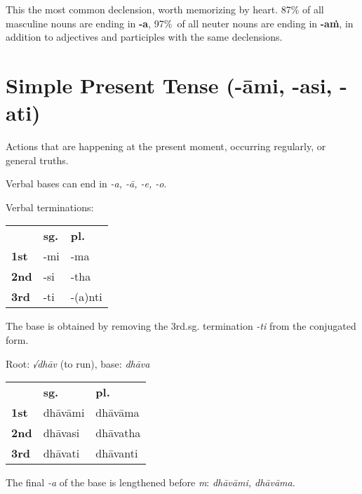 \documentclass[11pt,oneside]{memoir}
\begin{document}
This the most common declension, worth memorizing by heart. 87\% of all masculine
nouns are ending in \textbf{-a}, \mbox{97\% of} all neuter nouns are ending in \textbf{-aṁ}, in
addition to adjectives and participles with the same declensions.

\section{Simple Present Tense (-āmi, -asi, -ati)}
\label{sec:orgf85a945}

Actions that are happening at the present moment, occurring regularly, or general truths.

Verbal bases can end in \emph{-a, -ā, -e, -o}.

\bigskip
{\centering\par
\begin{multicols}{2}

Verbal terminations:

\begin{center}
\begin{tabular}{lll}
 & \textbf{sg.} & \textbf{pl.}\\[0pt]
\textbf{1st} & -mi & -ma\\[0pt]
\textbf{2nd} & -si & -tha\\[0pt]
\textbf{3rd} & -ti & -(a)nti\\[0pt]
\end{tabular}
\end{center}

The base is obtained by removing the 3rd.sg. termination \emph{-ti} from the conjugated form.

\columnbreak

Root: \emph{√dhāv} (to run), base: \emph{dhāva}

\begin{center}
\begin{tabular}{lll}
 & \textbf{sg.} & \textbf{pl.}\\[0pt]
\textbf{1st} & dhāvāmi & dhāvāma\\[0pt]
\textbf{2nd} & dhāvasi & dhāvatha\\[0pt]
\textbf{3rd} & dhāvati & dhāvanti\\[0pt]
\end{tabular}
\end{center}

The final \emph{-a} of the base is lengthened before \emph{m}: \emph{dhāvāmi, dhāvāma}.

\end{multicols}
\par}
\end{document}
